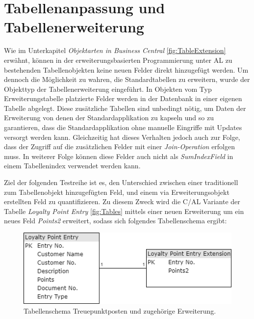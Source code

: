 \section{Tabellenanpassung und Tabellenerweiterung}
Wie im Unterkapitel \textit{Objektarten in Business Central} \ref{fig:TableExtension} erwähnt, können in der erweiterungsbasierten Programmierung unter AL zu bestehenden Tabellenobjekten keine neuen Felder direkt hinzugefügt werden. Um  dennoch die Möglichkeit zu wahren, die Standardtabellen zu erweitern, wurde der Objekttyp der Tabellenerweiterung eingeführt. In Objekten vom Typ Erweiterungstabelle platzierte Felder werden in der Datenbank in einer eigenen Tabelle abgelegt. Diese zusätzliche Tabellen sind unbedingt nötig, um Daten der Erweiterung von denen der Standardapplikation zu kapseln und so zu garantieren, dass die Standardapplikation ohne manuelle Eingriffe mit Updates versorgt werden kann. Gleichzeitig hat dieses Verhalten jedoch auch zur Folge, dass der Zugriff auf die zusätzlichen Felder mit einer \textit{Join-Operation} erfolgen muss. In weiterer Folge können diese Felder auch nicht als \textit{SumIndexField} in einem Tabellenindex verwendet werden kann. 

Ziel der folgenden Testreihe ist es, den Unterschied zwischen einer traditionell zum Tabellenobjekt hinzugefügten Feld, und einem via Erweiterungsobjekt erstellten Feld zu quantifizieren. Zu diesem Zweck wird die C/AL Variante der Tabelle \textit{Loyalty Point Entry} \ref{fig:Tables} mittels einer neuen Erweiterung um ein neues Feld \textit{Points2} erweitert, sodass sich folgendes Tabellenschema ergibt:

\begin{figure}[H]
	\centering
	\includegraphics[width=115mm]{images/Test2}
	\caption{Tabellenschema Treuepunktposten und zugehörige Erweiterung.}
	\label{fig:Test2Schema}
\end{figure}

